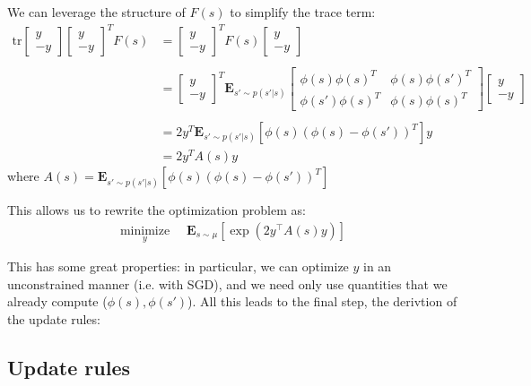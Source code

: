 \documentclass[11pt]{article}
\newcommand{\tr}{\text{tr}}
\begin{document}
We can leverage the structure of $F(s)$ to simplify the trace term:
\begin{align}
\tr  \begin{bmatrix} y \\ -y \end{bmatrix} \begin{bmatrix} y \\ -y \end{bmatrix}^T F(s)
    & = \begin{bmatrix} y \\ -y \end{bmatrix}^T F(s) \begin{bmatrix} y \\ -y \end{bmatrix} \\
\\  & =  \begin{bmatrix} y \\ -y \end{bmatrix}^T  \mathbf{E}_{s' \sim p(s'|s)}  \left[ \begin{array}{cc} \phi(s)\phi(s)^T & \phi(s)\phi(s')^T \\ \phi(s')\phi(s)^T & \phi(s)\phi(s)^T \end{array} \right]
 \begin{bmatrix} y \\ -y \end{bmatrix} \\
\\  & =  2 y^T \mathbf{E}_{s' \sim p(s'|s)} \left [\phi(s)(\phi(s)- \phi(s'))^T \right ] y
\\  & =  2 y^T A(s) y
\end{align}
where $A(s) = \mathbf{E}_{s' \sim p(s'|s)} \left [\phi(s)(\phi(s)- \phi(s'))^T \right ]$

This allows us to rewrite the optimization problem as:
\begin{align}
  \underset{y}{\text{minimize}} & \;\; \mathbf{E}_{s\sim\mu} \left [ \exp\left(2 y^\top A(s) y \right)  \right ]
\end{align}

This has some great properties: in particular, we can optimize $y$ in an unconstrained manner (i.e. with SGD), and we need only use quantities that we already compute ($\phi(s), \phi(s')$). All this leads to the final step, the derivtion of the update rules:


\subsection{Update rules}
\end{document}
